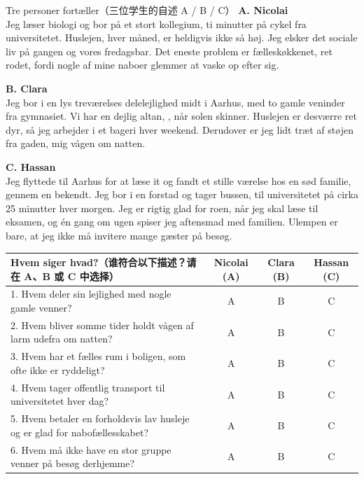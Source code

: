 \vspace{0.3em}
\begin{emailbox}{Tre personer fortæller（三位学生的自述 A / B / C）}
\textbf{A. Nicolai}\\
Jeg læser biologi og bor på et stort kollegium,  ti minutter på cykel fra universitetet. Huslejen,  hver måned, er heldigvis ikke så høj. Jeg elsker det sociale liv på gangen og vores fredagsbar. Det eneste problem er fælleskøkkenet,  ret rodet, fordi nogle af mine naboer glemmer at vaske op efter sig.

\vspace{0.35em}
\textbf{B. Clara}\\
Jeg bor i en lys treværelses delelejlighed midt i Aarhus,  med to gamle veninder fra gymnasiet. Vi har en dejlig altan, , når solen skinner. Huslejen er desværre ret dyr, så jeg arbejder i et bageri hver weekend. Derudover er jeg lidt træt af støjen fra gaden,  mig vågen om natten.

\vspace{0.35em}
\textbf{C. Hassan}\\
Jeg flyttede til Aarhus for at læse it og fandt et stille værelse hos en sød familie,  gennem en bekendt. Jeg bor i en forstad og tager bussen,  til universitetet på cirka 25 minutter hver morgen. Jeg er rigtig glad for roen, når jeg skal læse til eksamen, og én gang om ugen spiser jeg aftensmad med familien. Ulempen er bare, at jeg ikke må invitere mange gæster på besøg.
\end{emailbox}

\vspace{0.35em}
{\small
\renewcommand{\arraystretch}{1.28}
\begin{tabularx}{\linewidth}{@{} X c c c @{}}
\toprule
\textbf{Hvem siger hvad?（谁符合以下描述？请在 A、B 或 C 中选择）} & \textbf{Nicolai (A)} & \textbf{Clara (B)} & \textbf{Hassan (C)} \\
\midrule
1. Hvem deler sin lejlighed med nogle gamle venner? & A & B & C \\
2. Hvem bliver somme tider holdt vågen af larm udefra om natten? & A & B & C \\
3. Hvem har et fælles rum i boligen, som ofte ikke er ryddeligt? & A & B & C \\
4. Hvem tager offentlig transport til universitetet hver dag? & A & B & C \\
5. Hvem betaler en forholdsvis lav husleje og er glad for nabofællesskabet? & A & B & C \\
6. Hvem må ikke have en stor gruppe venner på besøg derhjemme? & A & B & C \\
\bottomrule
\end{tabularx}
}

